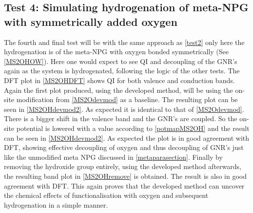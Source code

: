 \subsection{Test 4: Simulating hydrogenation of meta-NPG with symmetrically added oxygen}\label{test4}
The fourth and final test will be with the same approach as \cref{test2} only here the hydrogenation is of the meta-NPG with oxygen bonded symmetrically (See \cref{MS2OHOW}). Here one would expect to see QI and decoupling of the GNR's again as the system is hydrogenated, following the logic of the other tests. The DFT plot in \cref{MS2OHDFT} shows QI for both valence and conduction bands. Again the first plot produced, using the developed method, will be using the on-site modification from \cref{MS2Odevmod} as a baseline. The resulting plot can be seen in \cref{MS2OHdevmod2}. As expected it is identical to that of \cref{MS2Odevmod}. There is a bigger shift in the valence band and the GNR's are coupled. So the on-site potential is lowered with a value according to \cref{potmapMS2OH} and the result can be seen in \cref{MS2OHdevmod2}. As expected the plot is in good agreement with DFT, showing effective decoupling of oxygen and thus decoupling of GNR's just like the unmodified meta NPG discussed in \cref{metaparasection}. Finally by removing the hydroxide group entirely, using the developed method afterwards, the resulting band plot in \cref{MS2OHremove} is obtained. The result is also in good agreement with DFT. This again proves that the developed method can uncover the chemical effects of functionalisation with oxygen and subsequent hydrogenation in a simple manner.
